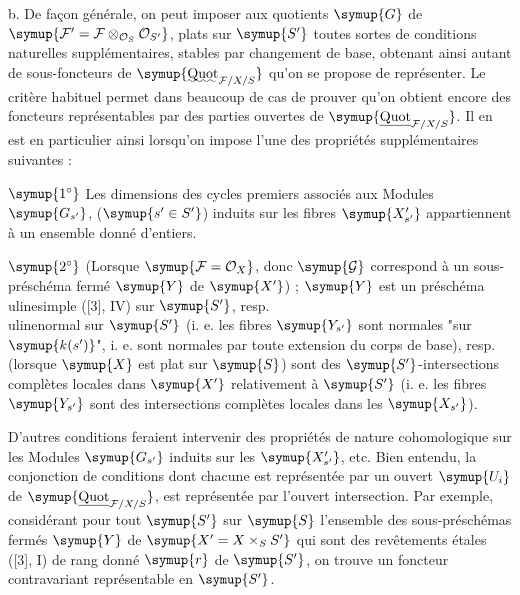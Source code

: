 \medskip
\noindent b. De façon générale, on peut imposer aux quotients $\symup{G}$ de
$\symup{\mathcal F'=\mathcal F\otimes_{\mathcal O_S}\mathcal O_{S'}}$, plats sur $\symup{S'}$
toutes sortes de conditions naturelles supplémentaires, stables par changement
de base, obtenant ainsi autant de sous-foncteurs de
$\symup{\mathop{\text{\uwave{Quot}}}\nolimits_{\mathcal F/X/S}}$ qu'on se propose de
représenter. Le critère habituel permet dans beaucoup de cas de prouver qu'on
obtient encore des foncteurs représentables par des parties ouvertes de
$\symup{\underline{\operatorname{Quot}}_{\mathcal F/X/S}}$. Il en est en particulier ainsi
lorsqu'on impose l'une des propriétés supplémentaires suivantes :

\smallskip
\noindent $\symup{1^\circ}$ Les dimensions des cycles premiers associés aux Modules
$\symup{G_{s'}}$, ($\symup{s'\in S'}$) induits sur les fibres $\symup{X'_{s'}}$ appartiennent
à un ensemble donné d'entiers.

\smallskip
\noindent $\symup{2^\circ}$ (Lorsque $\symup{\mathcal F=\mathcal O_X}$, donc $\symup{\mathcal G}$
correspond à un sous-préschéma fermé $\symup{Y}$ de $\symup{X'}$) ; $\symup{Y}$ est un préschéma \\uline{simple}
([3], IV) sur $\symup{S'}$, resp. \\uline{normal} sur $\symup{S'}$ (i. e. les fibres $\symup{Y_{s'}}$ sont normales
"sur $\symup{k(s')}$", i. e. sont normales par toute extension du corps de base),
resp. (lorsque $\symup{X}$ est plat sur $\symup{S}$) sont des $\symup{S'}$-intersections complètes
locales dans $\symup{X'}$ relativement à $\symup{S'}$ (i. e. les fibres $\symup{Y_{s'}}$ sont des
intersections complètes locales dans les $\symup{X_{s'}}$).

D'autres conditions feraient intervenir des propriétés de nature
cohomologique sur les Modules $\symup{G_{s'}}$ induits sur les $\symup{X'_{s'}}$,
etc. Bien entendu, la conjonction de conditions dont chacune est représentée
par un ouvert $\symup{U_i}$ de $\symup{\underline{\operatorname{Quot}}_{\mathcal F/X/S}}$, est représentée
par l'ouvert intersection. Par exemple, considérant pour tout $\symup{S'}$ sur $\symup{S}$
l'ensemble des sous-préschémas fermés $\symup{Y}$ de $\symup{X'=X\times_SS'}$ qui sont des
revêtements étales ([3], I) de rang donné $\symup{r}$ de $\symup{S'}$, on trouve un foncteur
contravariant représentable en $\symup{S'}$.

